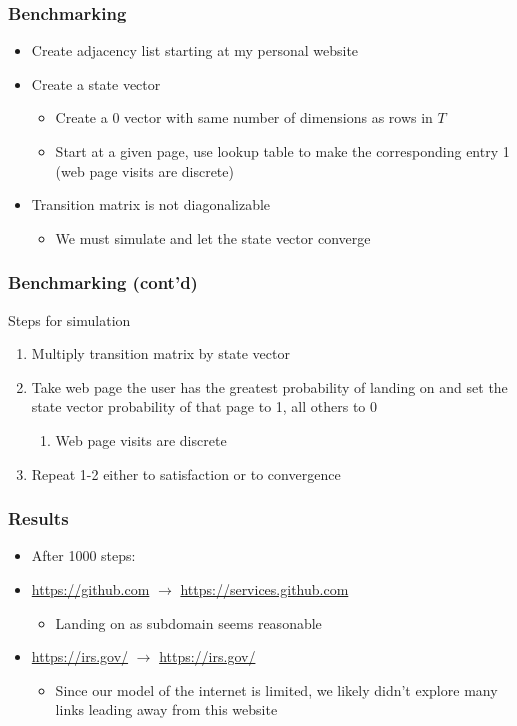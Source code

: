\documentclass{beamer}
\begin{document}
\begin{frame}
  \frametitle{Benchmarking}
  \begin{itemize}
    \item Create adjacency list starting at my personal website
    \item Create a state vector
      \begin{itemize}
        \item Create a 0 vector with same number of dimensions as rows in $T$ \\
        \item Start at a given page, use lookup table to make the corresponding entry 1
          (web page visits are discrete)
      \end{itemize}
    \item Transition matrix is not diagonalizable
      \begin{itemize}
        \item We must simulate and let the state vector converge
      \end{itemize}
  \end{itemize}
\end{frame}

\begin{frame}
  \frametitle{Benchmarking (cont'd)}
  Steps for simulation
  \begin{enumerate}
    \item Multiply transition matrix by state vector
    \item Take web page the user has the greatest probability of landing on and
      set the state vector probability of that page to 1, all others to 0
      \begin{enumerate}
        \item Web page visits are discrete
      \end{enumerate}
    \item Repeat 1-2 either to satisfaction or to convergence
  \end{enumerate}
\end{frame}

\begin{frame}
  \frametitle{Results}
  \begin{itemize}
    \item After 1000 steps:
    \item \href{https://github.com}{https://github.com} $\rightarrow$ \href{https://services.github.com}{https://services.github.com}
        \begin{itemize}
          \item Landing on as subdomain seems reasonable
        \end{itemize}
    \item \href{https://irs.gov/}{https://irs.gov/} $\rightarrow$ \href{https://irs.gov/}{https://irs.gov/}
        \begin{itemize}
          \item Since our model of the internet is limited, we likely didn't explore
            many links leading away from this website
        \end{itemize}
  \end{itemize}
\end{frame}
\end{document}
